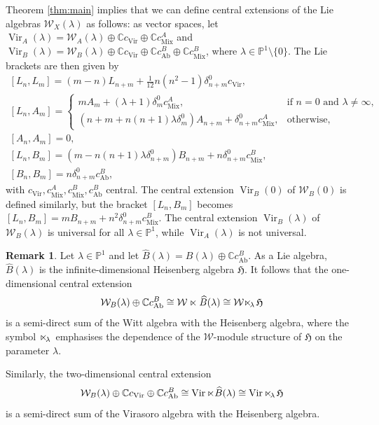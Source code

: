 \documentclass[11pt, svgnames]{amsart}
\DeclareMathOperator{\Vir}{Vir}
\newcommand{\CC}{\mathbb{C}}
\newcommand{\PP}{\mathbb{P}}
\newcommand{\W}{\mathcal{W}}
\DeclareMathOperator{\Ab}{Ab}
\DeclareMathOperator{\Mix}{Mix}
\newcommand{\nonzero}{\setminus \{0\}}
\newcommand{\lsemidirect}[1]{{\ltimes}\!_{#1} \mkern2mu}
\theoremstyle{definition}
\newtheorem{remark}[proposition]{Remark}
\begin{document}
Theorem \ref{thm:main} implies that we can define central extensions of the Lie algebras $\W_X(\lambda)$ as follows: as vector spaces, let $\Vir_A(\lambda) = \W_A(\lambda) \oplus \CC c_{\Vir} \oplus \CC c_{\Mix}^A$ and $\Vir_B(\lambda) = \W_B(\lambda) \oplus \CC c_{\Vir} \oplus \CC c_{\Ab}^B \oplus \CC c_{\Mix}^B$, where $\lambda \in \PP^1 \nonzero$. The Lie brackets are then given by
$$\begin{gathered}
    [L_n,L_m] = (m - n)L_{n+m} + \frac{1}{12}n(n^2 - 1)\delta_{n+m}^0 c_{\Vir}, \\
    [L_n,A_m] = \begin{cases}
        m A_m + (\lambda + 1)\delta_m^0 c_{\Mix}^A, &\text{if } n = 0 \text{ and } \lambda \neq \infty, \\
        (n + m + n(n + 1)\lambda \delta_m^0)A_{n+m} + \delta_{n+m}^0 c_{\Mix}^A, &\text{otherwise},
    \end{cases} \\
    [A_n,A_m] = 0, \\
    [L_n,B_m] = (m - n(n + 1)\lambda \delta_{n+m}^0)B_{n+m} + n\delta_{n+m}^0 c_{\Mix}^B, \\
    [B_n,B_m] = n\delta_{n+m}^0 c_{\Ab}^B,
\end{gathered}$$
with $c_{\Vir}, c_{\Mix}^A, c_{\Mix}^B, c_{\Ab}^B$ central. The central extension $\Vir_B(0)$ of $\W_B(0)$ is defined similarly, but the bracket $[L_n,B_m]$ becomes $[L_n,B_m] = m B_{n+m} + n^2\delta_{n+m}^0 c_{\Mix}^B$. The central extension $\Vir_B(\lambda)$ of $\W_B(\lambda)$ is universal for all $\lambda \in \PP^1$, while $\Vir_A(\lambda)$ is not universal.

\begin{remark}
    Let $\lambda \in \PP^1$ and let $\widehat{B}(\lambda) = B(\lambda) \oplus \CC c_{\Ab}^B$. As a Lie algebra, $\widehat{B}(\lambda)$ is the infinite-dimensional Heisenberg algebra $\mathfrak{H}$. It follows that the one-dimensional central extension
    $$\W_B(\lambda) \oplus \CC c_{\Ab}^B \cong \W \ltimes \widehat{B}(\lambda) \cong \W \lsemidirect{\lambda} \mathfrak{H}$$
    is a semi-direct sum of the Witt algebra with the Heisenberg algebra, where the symbol $\lsemidirect{\lambda}$ emphasises the dependence of the $\W$-module structure of $\mathfrak{H}$ on the parameter $\lambda$.

    Similarly, the two-dimensional central extension
    $$\W_B(\lambda) \oplus \CC c_{\Vir} \oplus \CC c_{\Ab}^B \cong \Vir \ltimes \widehat{B}(\lambda) \cong \Vir \lsemidirect{\lambda} \mathfrak{H}$$
    is a semi-direct sum of the Virasoro algebra with the Heisenberg algebra.
\end{remark}
\end{document}
